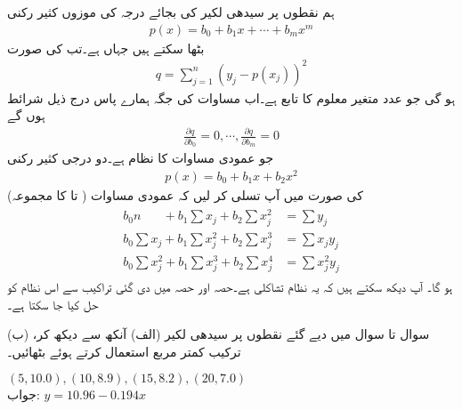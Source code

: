 ہم نقطوں پر سیدھی لکیر  کی بجائے درجہ  کی موزوں کثیر رکنی
\begin{align*}
p(x)=b_0+b_1x+\cdots+b_mx^m
\end{align*}
بٹھا سکتے ہیں جہاں  ہے۔تب  کی صورت 
\begin{align*}
q=\sum_{j=1}^{n}(y_j-p(x_j))^2
\end{align*}
ہو گی جو  عدد متغیر معلوم  کا تابع ہے۔اب مساوات  کی  جگہ ہمارے پاس درج ذیل  شرائط ہوں گے
\begin{align*}
\frac{\partial q}{\partial b_0}=0,\cdots,\frac{\partial q}{\partial b_m}=0
\end{align*}
جو   عمودی مساوات کا نظام ہے۔دو درجی کثیر رکنی
\begin{align}\label{مساوات_خطی_اعدادی_کمتر_مربع_شرائط_ت}
p(x)=b_0+b_1x+b_2x^2
\end{align}
 کی صورت میں آپ تسلی کر لیں کہ عمودی مساوات ( تا  کا مجموعہ)
\begin{gather}
\begin{aligned}\label{مساوات_خطی_اعدادی_کمتر_مربع_شرائط_ٹ}
b_0 n\phantom{\sum {}_j}+b_1\sum x_j+b_2\sum x_j^2&=\sum y_j\\[0.5ex]
b_0 \sum x_j +b_1\sum x_j^2 +b_2\sum x_j^3&=\sum x_jy_j\\[0.5ex]
b_0 \sum x_j^2+b_1\sum x_j^3+b_2\sum x_j^4&=\sum x_j^2y_j
\end{aligned}
\end{gather}
ہو گا۔ آپ دیکھ سکتے ہیں کہ یہ نظام تشاکلی ہے۔حصہ  اور حصہ  میں دی گئی تراکیب سے اس نظام کو حل کیا جا سکتا ہے۔


سوال  تا سوال  میں دیے گئے نقطوں پر سیدھی لکیر (الف) آنکھ سے دیکھ کر، (ب)  ترکیب کمتر مربع استعمال کرتے ہوئے  بٹھائیں۔ 

\quad
$(5,10.0), (10,8.9), (15,8.2), (20,7.0)$\\
جواب:\quad
$y=10.96-0.194x$

